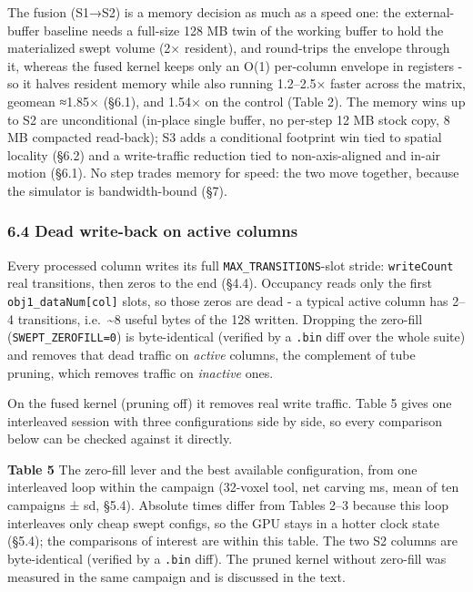 \documentclass[
]{article}
\begin{document}
The fusion (S1→S2) is a memory decision as much as a speed one: the
external-buffer baseline needs a full-size 128 MB twin of the working
buffer to hold the materialized swept volume (2× resident), and
round-trips the envelope through it, whereas the fused kernel keeps only
an O(1) per-column envelope in registers - so it halves resident memory
while also running 1.2--2.5× faster across the matrix, geomean ≈1.85×
(§6.1), and 1.54× on the control (Table 2). The memory wins up to S2 are
unconditional (in-place single buffer, no per-step 12 MB stock copy, 8
MB compacted read-back); S3 adds a conditional footprint win tied to
spatial locality (§6.2) and a write-traffic reduction tied to
non-axis-aligned and in-air motion (§6.1). No step trades memory for
speed: the two move together, because the simulator is bandwidth-bound
(§7).

\hypertarget{dead-write-back-on-active-columns}{%
\subsubsection{6.4 Dead write-back on active
columns}\label{dead-write-back-on-active-columns}}

Every processed column writes its full \texttt{MAX\_TRANSITIONS}-slot
stride: \texttt{writeCount} real transitions, then zeros to the end
(§4.4). Occupancy reads only the first \texttt{obj1\_dataNum{[}col{]}}
slots, so those zeros are dead - a typical active column has 2--4
transitions, i.e.~\textasciitilde8 useful bytes of the 128 written.
Dropping the zero-fill (\texttt{SWEPT\_ZEROFILL=0}) is byte-identical
(verified by a \texttt{.bin} diff over the whole suite) and removes that
dead traffic on \emph{active} columns, the complement of tube pruning,
which removes traffic on \emph{inactive} ones.

On the fused kernel (pruning off) it removes real write traffic. Table 5
gives one interleaved session with three configurations side by side, so
every comparison below can be checked against it directly.

{\small \textbf{Table 5} The zero-fill lever and the best available
configuration, from one interleaved loop within the campaign (32-voxel
tool, net carving ms, mean of ten campaigns ± sd, §5.4). Absolute times
differ from Tables 2--3 because this loop interleaves only cheap swept
configs, so the GPU stays in a hotter clock state (§5.4); the
comparisons of interest are within this table. The two S2 columns are
byte-identical (verified by a \texttt{.bin} diff). The pruned kernel
without zero-fill was measured in the same campaign and is discussed in
the text.}
\end{document}
